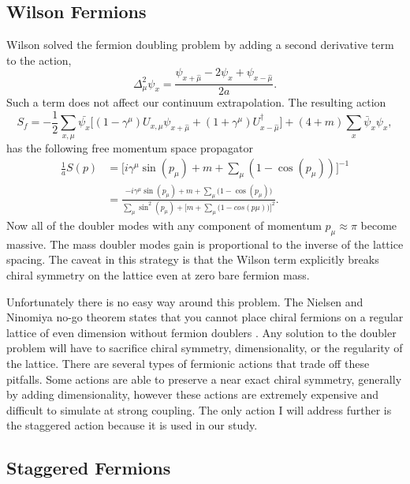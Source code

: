 \subsection{Wilson Fermions}
Wilson solved the fermion doubling problem by adding a second derivative term to the action,
\begin{equation}
  \Delta_\mu^2\psi_x=\frac{\psi_{x+\hat{\mu}}-2\psi_x+\psi_{x-\hat{\mu}}}{2a}.
\end{equation}
Such a term does not affect our continuum extrapolation.
The resulting action
\begin{equation}
  S_f=-\frac{1}{2}\sum_{x,\mu}\bar{\psi_x}\Big[(1-\gamma^\mu)U_{x,\mu}\psi_{x+\hat{\mu}}+(1+\gamma^\mu)U^\dagger_{x-\hat{\mu}}\Big]+(4+m)\sum_x\bar{\psi}_x\psi_x,
\end{equation}
has the following free momentum space propagator
\begin{equation}
  \begin{aligned}
    \frac{1}{a}S(p)&=\Big[i\gamma^\mu\sin(p_\mu)+m+\sum_\mu(1-\cos(p_\mu))\Big]^{-1}  \\
                   &=\frac{-i\gamma^\mu\sin(p_\mu)+m+\sum_\mu\big(1-\cos(p_\mu)\big)}{\sum_\mu\sin^2(p_\mu)+\Big[m+\sum_\mu\big(1-cos(p\mu)\big)\Big]^2}.
  \end{aligned}
\end{equation}
Now all of the doubler modes with any component of momentum $p_\mu\approx\pi$ become massive.
The mass doubler modes gain is proportional to the inverse of the lattice spacing.
The caveat in this strategy is that the Wilson term explicitly breaks chiral symmetry on the lattice even at zero bare fermion mass.

Unfortunately there is no easy way around this problem.
The Nielsen and Ninomiya no-go theorem states that you cannot place chiral fermions on a regular lattice of even dimension without fermion doublers \cite{Nielsen198120,Nielsen1981173,Nielsen1981219,kaplan:fermions}.
Any solution to the doubler problem will have to sacrifice chiral symmetry, dimensionality, or the regularity of the lattice.
There are several types of fermionic actions that trade off these pitfalls.
Some actions are able to preserve a near exact chiral symmetry, generally by adding dimensionality, however these actions are extremely expensive and difficult to simulate at strong coupling.
The only action I will address further is the staggered action because it is used in our study.

\subsection{Staggered Fermions}

